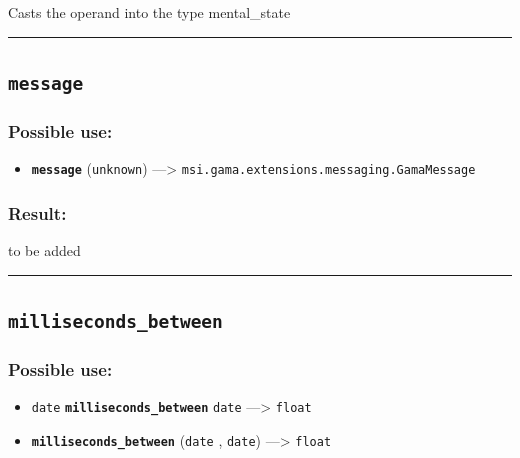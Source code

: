 \documentclass[]{book}
\providecommand{\tightlist}{%
  \setlength{\itemsep}{0pt}\setlength{\parskip}{0pt}}
\theoremstyle{definition}
\theoremstyle{definition}
\theoremstyle{definition}
\theoremstyle{remark}
\begin{document}
Casts the operand into the type mental\_state

\begin{center}\rule{0.5\linewidth}{\linethickness}\end{center}

\subsection{\texorpdfstring{\texttt{message}}{message}}\label{message}

\subsubsection{Possible use:}\label{possible-use-349}

\begin{itemize}
\tightlist
\item
  \textbf{\texttt{message}} (\texttt{unknown}) ---\textgreater{}
  \texttt{msi.gama.extensions.messaging.GamaMessage}
\end{itemize}

\subsubsection{Result:}\label{result-338}

to be added

\begin{center}\rule{0.5\linewidth}{\linethickness}\end{center}

\subsection{\texorpdfstring{\texttt{milliseconds\_between}}{milliseconds\_between}}\label{milliseconds_between}

\subsubsection{Possible use:}\label{possible-use-350}

\begin{itemize}
\tightlist
\item
  \texttt{date} \textbf{\texttt{milliseconds\_between}} \texttt{date}
  ---\textgreater{} \texttt{float}
\item
  \textbf{\texttt{milliseconds\_between}} (\texttt{date} ,
  \texttt{date}) ---\textgreater{} \texttt{float}
\end{itemize}
\end{document}
